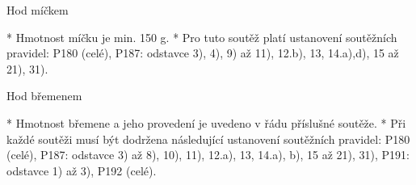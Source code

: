 Hod míčkem

* Hmotnost míčku je min. 150 g.
* Pro tuto soutěž platí ustanovení soutěžních pravidel: P180 (celé), P187: odstavce  3), 4), 9) až 11), 12.b), 13, 14.a),d), 15 až 21), 31).

Hod břemenem

* Hmotnost břemene a jeho provedení je uvedeno v řádu příslušné soutěže.
* Při každé soutěži musí být dodržena následující ustanovení soutěžních pravidel: P180 (celé), P187: odstavce  3) až 8), 10), 11), 12.a), 13, 14.a), b), 15 až 21), 31), P191: odstavce 1) až 3), P192 (celé).
\enditems

\endinput